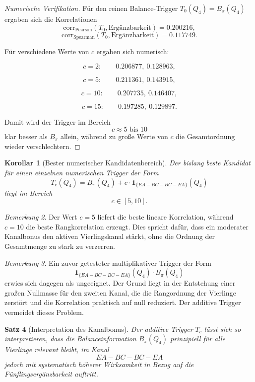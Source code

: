 \documentclass[11pt,a4paper]{article}
\newtheorem{satz}{Satz}
\newtheorem{korollar}[satz]{Korollar}
\theoremstyle{definition}
\theoremstyle{remark}
\newtheorem{bemerkung}[satz]{Bemerkung}
\begin{document}
	\begin{proof}[Numerische Verifikation]
		Für den reinen Balance-Trigger \(T_0(Q_4)=B_\pi(Q_4)\) ergaben sich die Korrelationen
		\[
		\mathrm{corr}_{\mathrm{Pearson}}(T_0,\text{Ergänzbarkeit})=0.200216,
		\]
		\[
		\mathrm{corr}_{\mathrm{Spearman}}(T_0,\text{Ergänzbarkeit})=0.117749.
		\]
		
		Für verschiedene Werte von \(c\) ergaben sich numerisch:
		
		\[
		c=2:
		\qquad
		0.206877,\ 0.128963,
		\]
		
		\[
		c=5:
		\qquad
		0.211361,\ 0.143915,
		\]
		
		\[
		c=10:
		\qquad
		0.207735,\ 0.146407,
		\]
		
		\[
		c=15:
		\qquad
		0.197285,\ 0.129897.
		\]
		
		Damit wird der Trigger im Bereich
		\[
		c\approx 5\text{ bis }10
		\]
		klar besser als \(B_\pi\) allein, während zu große Werte von \(c\) die Gesamtordnung wieder
		verschlechtern.
	\end{proof}
	
	\begin{korollar}[Bester numerischer Kandidatenbereich]
		\label{kor:bester_triggerbereich}
		Der bislang beste Kandidat für einen einzelnen numerischen Trigger der Form
		\[
		T_c(Q_4)=B_\pi(Q_4)+c\cdot \mathbf 1_{\{EA-BC-BC-EA\}}(Q_4)
		\]
		liegt im Bereich
		\[
		\boxed{
			c\in[5,10].
		}
		\]
	\end{korollar}
	
	\begin{bemerkung}
		Der Wert \(c=5\) liefert die beste lineare Korrelation, während \(c=10\) die beste
		Rangkorrelation erzeugt. Dies spricht dafür, dass ein moderater Kanalbonus den aktiven
		Vierlingskanal stärkt, ohne die Ordnung der Gesamtmenge zu stark zu verzerren.
	\end{bemerkung}
	
	\begin{bemerkung}
		Ein zuvor getesteter multiplikativer Trigger der Form
		\[
		\mathbf 1_{\{EA-BC-BC-EA\}}(Q_4)\cdot B_\pi(Q_4)
		\]
		erwies sich dagegen als ungeeignet. Der Grund liegt in der Entstehung einer großen
		Nullmasse für den zweiten Kanal, die die Rangordnung der Vierlinge zerstört und die
		Korrelation praktisch auf null reduziert. Der additive Trigger vermeidet dieses Problem.
	\end{bemerkung}
	
	\begin{satz}[Interpretation des Kanalbonus]
		\label{satz:interpretation_kanalbonus}
		Der additive Trigger \(T_c\) lässt sich so interpretieren, dass die Balanceinformation
		\(B_\pi(Q_4)\) prinzipiell für alle Vierlinge relevant bleibt, im Kanal
		\[
		EA-BC-BC-EA
		\]
		jedoch mit systematisch höherer Wirksamkeit in Bezug auf die Fünflingsergänzbarkeit
		auftritt.
	\end{satz}
	
\end{document}
